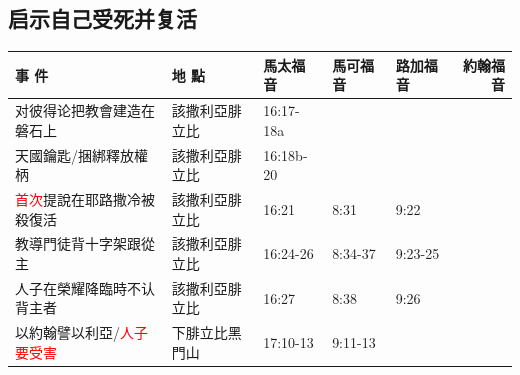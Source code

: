 \subsection{启示自己受死并复活}
\begin{table}[H] \centering 
\begin{tabular}{p{13.07em}|l|l|l|p{5.285em}|r}\toprule
\textbf{事 件} & \multicolumn{1}{p{7.93em}|}{\textbf{地 點}} & \multicolumn{1}{p{5.285em}|}{\textbf{馬太福音}} & \multicolumn{1}{p{5.57em}|}{\textbf{馬可福音}} & \textbf{路加福音} & \multicolumn{1}{p{4.855em}}{\textbf{約翰福音}} \\\midrule



对彼得论把教會建造在磐石上& \multicolumn{1}{p{7.93em}|}{該撒利亞腓立比} & \multicolumn{1}{p{5.285em}|}{16:17-18a} & \multicolumn{1}{p{5.57em}|}{} &  &  \\ \midrule

天國鑰匙/捆綁釋放權柄& \multicolumn{1}{p{7.93em}|}{該撒利亞腓立比} & \multicolumn{1}{p{5.285em}|}{16:18b-20} & \multicolumn{1}{p{5.57em}|}{} &  &  \\ \midrule

\textcolor{red}{首次}提說在耶路撒冷被殺復活& \multicolumn{1}{p{7.93em}|}{該撒利亞腓立比} & \multicolumn{1}{p{5.285em}|}{16:21} & \multicolumn{1}{p{5.57em}|}{8:31} & 9:22&  \\ \midrule



教導門徒背十字架跟從主& \multicolumn{1}{p{7.93em}|}{該撒利亞腓立比} & \multicolumn{1}{p{5.285em}|}{16:24-26} & \multicolumn{1}{p{5.57em}|}{8:34-37} & 9:23-25&  \\ \midrule


人子在榮耀降臨時不认背主者& \multicolumn{1}{p{7.93em}|}{該撒利亞腓立比} & \multicolumn{1}{p{5.285em}|}{16:27} & \multicolumn{1}{p{5.57em}|}{8:38} & 9:26&  \\ \midrule



以約翰譬以利亞/\textcolor{red}{人子要受害}& \multicolumn{1}{p{7.93em}|}{下腓立比黑門山} & \multicolumn{1}{p{5.285em}|}{17:10-13} & \multicolumn{1}{p{5.57em}|}{9:11-13} &  &  \\ \midrule





\end{tabular}
\end{table}
